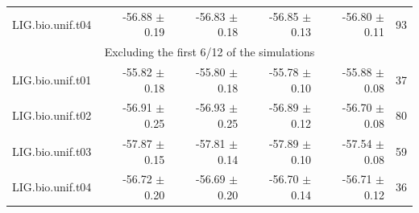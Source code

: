 \documentclass[journal=jctcce,manuscript=article,hyperref=false]{achemso}
\begin{document}
\begin{table}
{\begin{tabular}{l r r r r r}
                        LIG.bio.unif.t04 &  -56.88 $\pm$    0.19 &  -56.83 $\pm$    0.18 &  -56.85 $\pm$    0.13 &  -56.80 $\pm$    0.11 &      93 \\
\multicolumn{6}{c}{Excluding the first 6/12 of the simulations} \\
                        LIG.bio.unif.t01 &  -55.82 $\pm$    0.18 &  -55.80 $\pm$    0.18 &  -55.78 $\pm$    0.10 &  -55.88 $\pm$    0.08 &      37 \\
                        LIG.bio.unif.t02 &  -56.91 $\pm$    0.25 &  -56.93 $\pm$    0.25 &  -56.89 $\pm$    0.12 &  -56.70 $\pm$    0.08 &      80 \\
                        LIG.bio.unif.t03 &  -57.87 $\pm$    0.15 &  -57.81 $\pm$    0.14 &  -57.89 $\pm$    0.10 &  -57.54 $\pm$    0.08 &      59 \\
                        LIG.bio.unif.t04 &  -56.72 $\pm$    0.20 &  -56.69 $\pm$    0.20 &  -56.70 $\pm$    0.14 &  -56.71 $\pm$    0.12 &      36 \\

\hline
\end{tabular}
}
\end{table}
\end{document}

